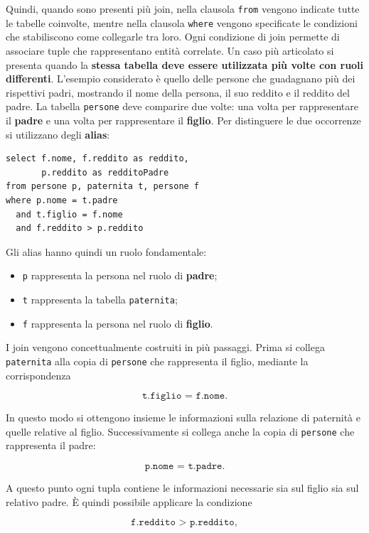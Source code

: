 \noindent Quindi, quando sono presenti più join, nella clausola \texttt{from} vengono indicate tutte le tabelle coinvolte, mentre nella clausola \texttt{where} vengono specificate le condizioni che stabiliscono come collegarle tra loro. Ogni condizione di join permette di associare tuple che rappresentano entità correlate. 
Un caso più articolato si presenta quando la \textbf{stessa tabella deve essere utilizzata più volte con ruoli differenti}. L'esempio considerato è quello delle persone che guadagnano più dei rispettivi padri, mostrando il nome della persona, il suo reddito e il reddito del padre.
La tabella \texttt{persone} deve comparire due volte: una volta per rappresentare il \textbf{padre} e una volta per rappresentare il \textbf{figlio}. Per distinguere le due occorrenze si utilizzano degli \textbf{alias}:

\begin{verbatim}
select f.nome, f.reddito as reddito,
       p.reddito as redditoPadre
from persone p, paternita t, persone f
where p.nome = t.padre
  and t.figlio = f.nome
  and f.reddito > p.reddito
\end{verbatim}

\noindent Gli alias hanno quindi un ruolo fondamentale:
\begin{itemize}
    \item \texttt{p} rappresenta la persona nel ruolo di \textbf{padre};
    \item \texttt{t} rappresenta la tabella \texttt{paternita};
    \item \texttt{f} rappresenta la persona nel ruolo di \textbf{figlio}.
\end{itemize}

\noindent I join vengono concettualmente costruiti in più passaggi. Prima si collega \texttt{paternita} alla copia di \texttt{persone} che rappresenta il figlio, mediante la corrispondenza

\[
\texttt{t.figlio = f.nome}.
\]

\noindent In questo modo si ottengono insieme le informazioni sulla relazione di paternità e quelle relative al figlio. Successivamente si collega anche la copia di \texttt{persone} che rappresenta il padre:

\[
\texttt{p.nome = t.padre}.
\]

\noindent A questo punto ogni tupla contiene le informazioni necessarie sia sul figlio sia sul relativo padre. È quindi possibile applicare la condizione

\[
\texttt{f.reddito > p.reddito},
\]

